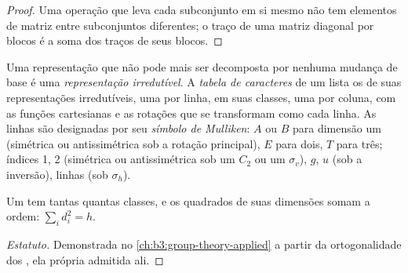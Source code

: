 \begin{proof}
Uma operação que leva cada subconjunto em si mesmo não tem elementos de
matriz entre subconjuntos diferentes; o traço de uma matriz diagonal por
blocos é a soma dos traços de seus blocos.
\end{proof}

\begin{definition}\label{def:b3:point-groups:irrep}
Uma representação que não pode mais ser decomposta por nenhuma mudança de base é
uma \emph{representação irredutível}. A
\emph{tabela de caracteres} de um  lista os
 de suas representações irredutíveis, uma por linha, em suas classes,
uma por coluna, com as funções cartesianas e as rotações que se transformam
como cada linha. As linhas são designadas por seu \emph{símbolo de
Mulliken}: $A$ ou $B$ para dimensão um (simétrica ou
antissimétrica sob a rotação principal), $E$ para dois, $T$ para três;
índices 1, 2 (simétrica ou antissimétrica sob um $C_2$ ou um $\sigma_v$), $g$, $u$
(sob a inversão), linhas (sob $\sigma_h$).
\end{definition}

\begin{proposition}\label{prop:b3:point-groups:irrep-count}
Um  tem tantas  quantas classes, e os
quadrados de suas dimensões somam a ordem: $\sum_id_i^2 = h$.
\end{proposition}
\begin{proof}[Estatuto]
Demonstrada no \cref{ch:b3:group-theory-applied} a partir da ortogonalidade
dos , ela própria admitida ali.
\end{proof}

